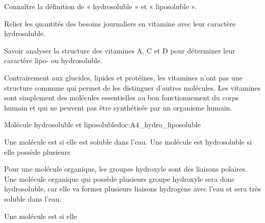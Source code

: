 \teteTermStssBiom



\begin{objectifs}
  \item Connaître la définition de « hydrosoluble » et « liposoluble ».
  \item Relier les quantités des besoins journaliers en vitamine avec leur caractère hydrosoluble.
  \item Savoir analyser la structure des vitamines A, C et D pour déterminer leur caractère lipo- ou hydrosoluble.
\end{objectifs}

\begin{contexte}
  Contrairement aux glucides, lipides et protéines, les vitamines n'ont pas une structure commune qui permet de les distinguer d'autres molécules.
  Les vitamines sont simplement des molécules essentielles au bon fonctionnement du corps humain et qui ne peuvent pas être synthétisée par un organisme humain.
  
\end{contexte}


\begin{doc}{Molécule hydrosoluble et liposoluble}{doc:A4_hydro_liposoluble}
  \begin{importants}
    Une molécule est  si elle est soluble dans l'eau.
    Une molécule est hydrosoluble si elle possède plusieurs 
  \end{importants}
  
  Pour une molécule organique, les groupes hydroxyle  sont des liaisons polaires.
  Une molécule organique qui possède plusieurs groupe hydroxyle sera donc hydrosoluble, car elle va former plusieurs liaisons hydrogène avec l'eau et sera très soluble dans l'eau.

  \begin{importants}
    Une molécule est  si elle 
  \end{importants}
\end{doc}


